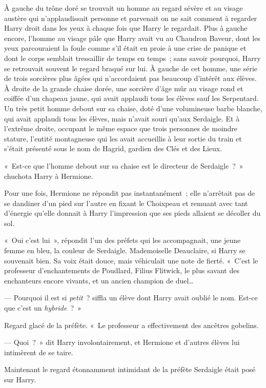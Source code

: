 À gauche du trône doré se trouvait un homme au regard sévère et au visage austère qui n'applaudissait personne et parvenait on ne sait comment à regarder Harry droit dans les yeux à chaque fois que Harry le regardait.
Plus à gauche encore, l'homme au visage pâle que Harry avait vu au Chaudron Baveur, dont les yeux parcouraient la foule comme s'il était en proie à une crise de panique et dont le corps semblait tressaillir de temps en temps~; sans savoir pourquoi, Harry se retrouvait souvent le regard braqué sur lui.
À gauche de cet homme, une série de trois sorcières plus âgées qui n'accordaient pas beaucoup d'intérêt aux élèves.
À droite de la grande chaise dorée, une sorcière d'âge mûr au visage rond et coiffée d'un chapeau jaune, qui avait applaudi tous les élèves sauf les Serpentard.
Un très petit homme debout sur sa chaise, doté d'une volumineuse barbe blanche, qui avait applaudi tous les élèves, mais n'avait souri qu'aux Serdaigle.
Et à l'extrême droite, occupant le même espace que trois personnes de moindre stature, l'entité montagneuse qui les avait accueillis à leur sortie du train et s'était présenté sous le nom de Hagrid, gardien des Clés et des Lieux.

«~Est-ce que l'homme debout sur sa chaise est le directeur de Serdaigle~?~» chuchota Harry à Hermione.

Pour une fois, Hermione ne répondit pas instantanément~; elle n'arrêtait pas de se dandiner d'un pied sur l'autre en fixant le Choixpeau et remuant avec tant d'énergie qu'elle donnait à Harry l'impression que ses pieds allaient se décoller du sol.

«~Oui c'est lui~», répondit l'un des préfets qui les accompagnait, une jeune femme en bleu, la couleur de Serdaigle.
Mademoiselle Deauclaire, si Harry se souvenait bien.
Sa voix était douce, mais véhiculait une note de fierté.
«~C'est le professeur d'enchantements de Poudlard, Filius Flitwick, le plus savant des enchanteurs encore vivants, et un ancien champion de duel…

--- Pourquoi il est si \emph{petit}~? siffla un élève dont Harry avait oublié le nom. Est-ce que c'est un \emph{hybride}~?~»

Regard glacé de la préfète. «~Le professeur a effectivement des ancêtres gobelins.

--- Quoi~?~» dit Harry involontairement, et Hermione et d'autres élèves lui intimèrent de se taire.

Maintenant le regard étonnamment intimidant de la préfète Serdaigle était posé sur Harry.

